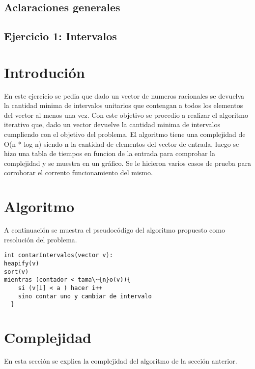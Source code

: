 \documentclass[a4paper, 12pt] {article}
\begin{document}
\begin{center}
\section*{Aclaraciones generales} 
\end{center}

\newpage

\begin{center}
\section*{Ejercicio 1: Intervalos}
\end{center}

\bigskip
\section*{Introduci\'on}
En este ejercicio se pedia que dado un vector de numeros racionales se devuelva la cantidad minima de intervalos unitarios que contengan a todos los elementos del vector al menos una vez.
Con este objetivo se procedio a realizar el algoritmo iterativo que, dado un vector devuelve la cantidad minima de intervalos cumpliendo con el objetivo del problema.
El algoritmo tiene una complejidad de O(n * log n) siendo n la cantidad de elementos del vector de entrada, luego se hizo una tabla de tiempos en funcion de la entrada para comprobar la complejidad y se muestra en un gr\'afico. Se le hicieron varios casos de prueba para corroborar el corrento funcionamiento del mismo.
\section*{Algoritmo}
A continuaci\'on se muestra el pseudoc\'odigo del algoritmo propuesto como resoluci\'on del problema.
\begin{verbatim}
int contarIntervalos(vector v):
heapify(v)
sort(v) 
mientras (contador < tama\~{n}o(v)){
    si (v[i] < a ) hacer i++
    sino contar uno y cambiar de intervalo
  }
\end{verbatim}

\section*{Complejidad}
En esta secci\'on se explica la complejidad del algoritmo de la secci\'on anterior.
\end{document}

